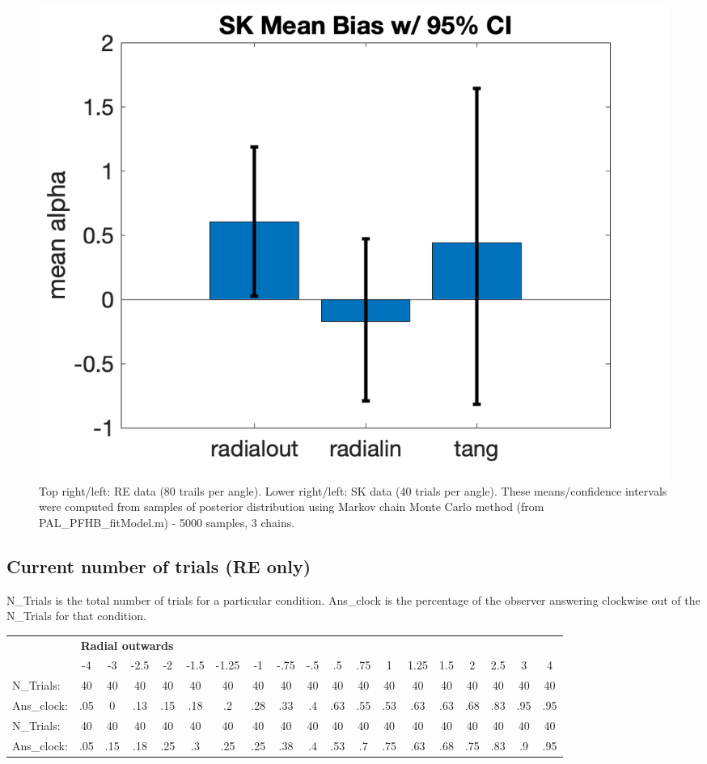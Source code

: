 \documentclass[11pt]{article} %
\begin{document}
\begin{figure}[H]
\includegraphics[scale=.2]{Images/MeanBiasError_95ci_SK.png}
\caption{Top right/left: RE data (80 trails per angle). Lower right/left: SK data (40 trials per angle). These means/confidence intervals were computed from samples of posterior distribution using Markov chain Monte Carlo method (from PAL\_PFHB\_fitModel.m) - 5000 samples, 3 chains.}
\end{figure}

\newpage
\subsection{Current number of trials (RE only)}
N\_Trials is the total number of trials for a particular condition.
Ans\_clock is the percentage of the observer answering clockwise out of the N\_Trials for that condition.
\begin{table}[htb]
  \label{tbl:stats-and-correlations}
  \small\begin{tabular*}{\linewidth}{l@{\extracolsep{\fill}}*{18}{c}}
    \toprule
    & \multicolumn{4}{c}{\textbf{Radial outwards}}\\ \cmidrule(r){2-18}
    & {-4} & {-3} & {-2.5} & {-2} & {-1.5} & {-1.25} & {-1} & {-.75} & {-.5} & {.5} & {.75} & {1} & {1.25} & {1.5} & {2} & {2.5}& {3}& {4} \\ [0.5ex]
    N\_Trials:  &    40 &    40 &    40 &    40 &    40 &    40 &    40&   40 &   40 &    40&    40&    40&   40&    40&    40 & 40 & 40 & 40\\
    Ans\_clock:  &  .05 &  0 &    .13 &    .15 &    .18 &    .2 &    .28 &   .33 &    .4&    .63&    .55&    .53&    .63&    .63&    .68&    .83 & .95 & .95\\
    N\_Trials:  &    40 &    40 &    40 &    40 &    40 &    40 &    40&   40 &   40 &    40&    40&    40&   40&    40&    40 & 40 & 40 & 40\\
    Ans\_clock:  &  .05 &  .15 &    .18 &   .25 &    .3 &    .25 &   .25 &    .38&    .4&    .53&    .7&    .75&    .63&    .68&    .75 & .83 & .9 & .95\\
    \bottomrule
  \end{tabular*}
\end{table}
\end{document}
